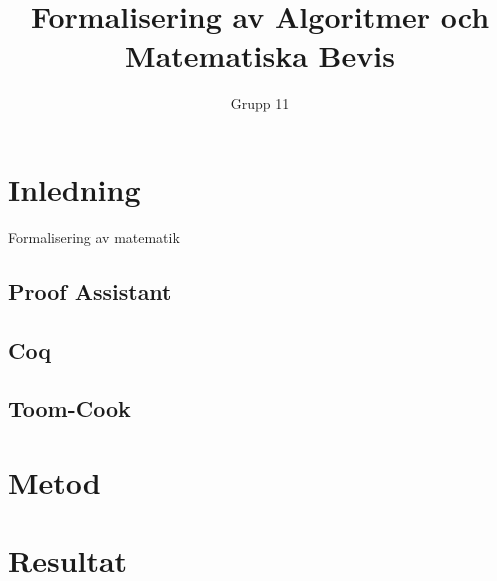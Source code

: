 \documentclass[a4paper]{article}
\author{Grupp 11}
\title{Formalisering av Algoritmer och Matematiska Bevis}
\begin{document}
\maketitle
\thispagestyle{empty}
\newpage
\tableofcontents
\newpage

\section{Inledning}
Formalisering av matematik

\subsection{Proof Assistant}
\subsection{Coq}
\subsection{Toom-Cook}

\section{Metod}

\section{Resultat}
\end{document}
